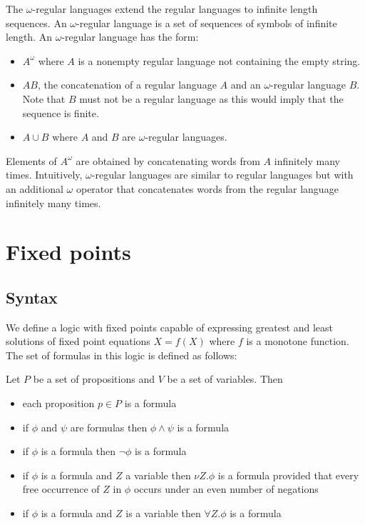 The $\omega$-regular languages extend the regular languages to infinite length sequences. An $\omega$-regular language is a set of sequences of symbols of infinite length. An $\omega$-regular language has the form:
\begin{itemize}
    \item $A^\omega$ where $A$ is a nonempty regular language not containing the empty string.
    \item $AB$, the concatenation of a regular language $A$ and an $\omega$-regular language $B$. Note that $B$ must not be a regular language as this would imply that the sequence is finite.
    \item $A \cup B$ where $A$ and $B$ are $\omega$-regular languages.
\end{itemize}

Elements of $A^\omega$ are obtained by concatenating words from $A$ infinitely many times. Intuitively, $\omega$-regular languages are similar to regular languages but with an additional $\omega$ operator that concatenates words from the regular language infinitely many times.

\section{Fixed points}
\label{sec:fixed_points}

\subsection{Syntax}

We define a logic with fixed points capable of expressing greatest and least solutions of fixed point equations $X = f(X)$ where $f$ is a monotone function. The set of formulas in this logic is defined as follows:

Let $P$ be a set of propositions and $V$ be a set of variables. Then

\begin{itemize}
    \item each proposition $p \in P$ is a formula
    \item if $\phi$ and $\psi$ are formulas then $\phi \wedge \psi$ is a formula
    \item if $\phi$ is a formula then $\neg \phi$ is a formula
    \item if $\phi$ is a formula and $Z$ a variable then $\nu Z.\phi$ is a formula provided that every free occurrence of $Z$ in $\phi$ occurs under an even number of negations
    \item if $\phi$ is a formula and $Z$ is a variable then $\forall Z. \phi$ is a formula
\end{itemize}

